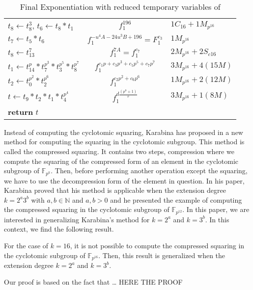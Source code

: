 \begin{center}
\begin{table}[!ht]
{\begin{tabular}{l|c|l}
			$t_{8} \leftarrow t_{8}^3$, $t_{6} \leftarrow t_{8}*t_{1}$&$f_1^{196}$&$1C_{16}+1M_{p^{16}}$\\
			$t_{7} \leftarrow t_{5}*t_{6}$&$f_1^{-u^4A-24u^3B+196}=F_1^{c_3}$&$1M_{p^{16}}$\\
			$t_{8} \leftarrow t_{13}^{7}$&$f_1^{7A}=f_1^{c_7}$&$2M_{p^{16}}+2S_{c16}$\\
			$t_{1} \leftarrow t_{14}^{p}* t_{7}^{p^3}* t_{3}^{p^5}* t_{8}^{p^7}$&$f_1^{c_1p+c_3p^3+c_5p^5+c_7p^7}$&$3M_{p^{16}}+4(15M)$\\
			$t_{2} \leftarrow t_{0}^{p^2}* t_{2}^{p^6}$&$f_1^{c_2p^2+c_6p^6}$&$1M_{p^{16}}+2(12M)$\\
			$t \leftarrow t_{9}*t_{2}*t_{1}*t_{4}^{p^4}$&$f_1^{d{\frac{(p^8+1)}{r}}}$&$3M_{p^{16}}+1(8M)$\\
			\textbf{return} $t$ & &\\
			\hline
		\end{tabular}
		}
		\caption{Final Exponentiation with reduced temporary variables of \cite{loubna_kss16}}
		\label{algo_final}
	\end{table}
\end{center}
\vspace{8mm}


Instead of computing the cyclotomic squaring, Karabina has proposed in \cite{Karabina13Squaring} a new method for computing the squaring in the cyclotomic subgroup. This method is called the compressed squaring. It contains two steps, compression where we compute the squaring of the compressed form of an element in the cyclotomic subgroup of $\mathbb{F}_{p^k}$. Then, before performing another operation except the squaring, we have to use the decompression form of the element in question.
In his paper, Karabina proved that his method is applicable when the extension degree $k=2^a3^b$ with $a, b \in \mathbb{N}$ and  $a, b>0$ and he presented the example of computing the compressed squaring in the cyclotomic subgroup of $\mathbb{F}_{p^{12}}$.
In this paper, we are interested in generalizing Karabina's method for  $k=2^a$ and $k=3^b$. In this context, we find the following result.
\begin{prop}
For the case of $k=16$, it is not possible to compute the compressed squaring in the cyclotomic subgroup of $\mathbb{F}_{p^{16}}$. Then, this result is generalized when the extension degree $k=2^a$ and $k=3^b$.
\end{prop}
Our proof is based on the fact that \dots 
HERE THE PROOF\\

